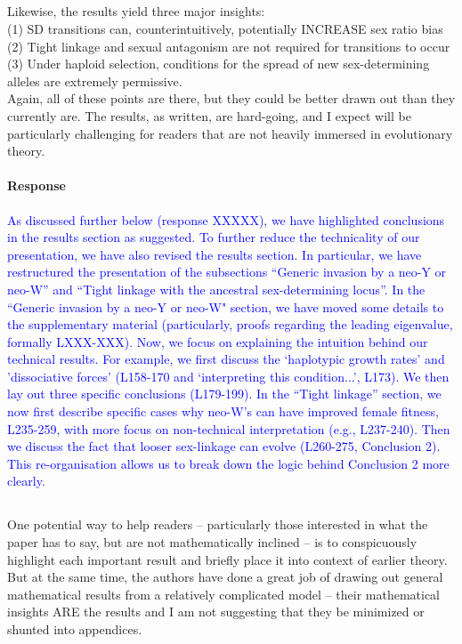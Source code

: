 \documentclass[10pt,letterpaper]{article}
\begin{document}
\noindent\subsection{}
Likewise, the results yield three major insights:\\
(1) SD transitions can, counterintuitively, potentially INCREASE sex ratio bias\\
(2) Tight linkage and sexual antagonism are not required for transitions to occur\\
(3) Under haploid selection, conditions for the spread of new sex-determining alleles are extremely permissive.\\
Again, all of these points are there, but they could be better drawn out than they currently are. The results, as written, are hard-going, and I expect will be particularly challenging for readers that are not heavily immersed in evolutionary theory.

\noindent\paragraph{Response}
\textcolor{blue}{
As discussed further below (response XXXXX), we have highlighted conclusions in the results section as suggested. 
To further reduce the technicality of our presentation, we have also revised the results section. 
In particular, we have restructured the presentation of the subsections ``Generic invasion by a neo-Y or neo-W'' and ``Tight linkage with the ancestral sex-determining locus''. 
In the ``Generic invasion by a neo-Y or neo-W" section, we have moved some details to the supplementary material (particularly, proofs regarding the leading eigenvalue, formally LXXX-XXX). 
Now, we focus on explaining the intuition behind our technical results.  
For example, we first discuss the `haplotypic growth rates' and 'dissociative forces' (L158-170 and `interpreting this condition...', L173).
We then lay out three specific conclusions (L179-199). 
In the ``Tight linkage'' section, we now first describe specific cases why neo-W's can have improved female fitness, L235-259, with more focus on non-technical interpretation (e.g., L237-240). 
Then we discuss the fact that looser sex-linkage can evolve (L260-275, Conclusion 2). 
This re-organisation allows us to break down the logic behind Conclusion 2 more clearly. 
}

\noindent\subsection{}
One potential way to help readers -- particularly those interested in what the paper has to say, but are not mathematically inclined -- is to conspicuously highlight each important result and briefly place it into context of earlier theory. But at the same time, the authors have done a great job of drawing out general mathematical results from a relatively complicated model -- their mathematical insights ARE the results and I am not suggesting that they be minimized or shunted into appendices.
\end{document}
